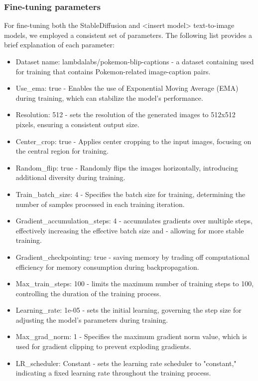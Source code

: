 \documentclass[conference]{IEEEtran}
\begin{document}
\subsubsection{Fine-tuning parameters}
For fine-tuning both the StableDiffusion and <insert model> text-to-image models, we employed a consistent set of parameters. The following list provides a brief explanation of each parameter:\begin{itemize}
\item{Dataset name: lambdalabs/pokemon-blip-captions - a dataset containing used for training that contains Pokemon-related image-caption pairs.}
\item{Use\_ema: true - Enables the use of Exponential Moving Average (EMA) during training, which can stabilize the model's performance.}
\item{Resolution: 512 - sets the resolution of the generated images to 512x512 pixels, ensuring a consistent output size.}
\item{Center\_crop: true - Applies center cropping to the input images, focusing on the central region for training.}
\item{Random\_flip: true - Randomly flips the images horizontally, introducing additional diversity during training.}
\item{Train\_batch\_size: 4 - Specifies the batch size for training, determining the number of samples processed in each training iteration.}
\item{Gradient\_accumulation\_steps: 4 - accumulates gradients over multiple steps, effectively increasing the effective batch size and - allowing for more stable training.}
\item{Gradient\_checkpointing: true - saving memory by trading off computational efficiency for memory consumption during backpropagation.}
\item{Max\_train\_steps: 100 - limits the maximum number of training steps to 100, controlling the duration of the training process.}
\item{Learning\_rate: 1e-05 - sets the initial learning, governing the step size for adjusting the model's parameters during training.}
\item{Max\_grad\_norm: 1 - Specifies the maximum gradient norm value, which is used for gradient clipping to prevent exploding gradients.}
\item{LR\_scheduler: Constant - sets the learning rate scheduler to "constant," indicating a fixed learning rate throughout the training process.}
\end{itemize}
\end{document}
